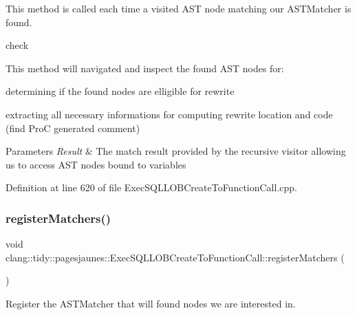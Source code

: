 This method is called each time a visited A\+ST node matching our A\+S\+T\+Matcher is found. 

check

This method will navigated and inspect the found A\+ST nodes for\+:
\begin{DoxyItemize}
\item determining if the found nodes are elligible for rewrite
\item extracting all necessary informations for computing rewrite location and code (find ProC generated comment)
\end{DoxyItemize}


\begin{DoxyParams}{Parameters}
{\em Result} & The match result provided by the recursive visitor allowing us to access A\+ST nodes bound to variables \\
\hline
\end{DoxyParams}


Definition at line 620 of file Exec\+S\+Q\+L\+L\+O\+B\+Create\+To\+Function\+Call.\+cpp.

\mbox{\label{classclang_1_1tidy_1_1pagesjaunes_1_1_exec_s_q_l_l_o_b_create_to_function_call_aaab1c3eda2a4c120576ca88bc6f87912}} 
\subsubsection{\texorpdfstring{register\+Matchers()}{registerMatchers()}}
{\footnotesize\ttfamily void clang\+::tidy\+::pagesjaunes\+::\+Exec\+S\+Q\+L\+L\+O\+B\+Create\+To\+Function\+Call\+::register\+Matchers (\begin{DoxyParamCaption}\item[{ast\+\_\+matchers\+::\+Match\+Finder $\ast$}]{ }\end{DoxyParamCaption})\hspace{0.3cm}{\ttfamily [override]}}



Register the A\+S\+T\+Matcher that will found nodes we are interested in. 

